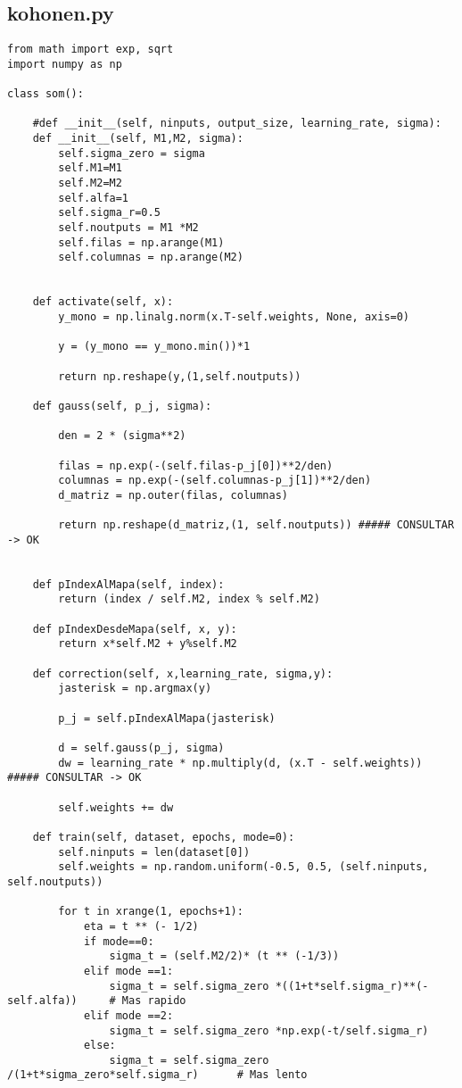\subsection{kohonen.py}
\begin{lstlisting}[caption=main.py]
from math import exp, sqrt
import numpy as np

class som():

    #def __init__(self, ninputs, output_size, learning_rate, sigma):
    def __init__(self, M1,M2, sigma):
        self.sigma_zero = sigma
        self.M1=M1
        self.M2=M2
        self.alfa=1
        self.sigma_r=0.5
        self.noutputs = M1 *M2
        self.filas = np.arange(M1)
        self.columnas = np.arange(M2)  
        

    def activate(self, x):
        y_mono = np.linalg.norm(x.T-self.weights, None, axis=0)

        y = (y_mono == y_mono.min())*1

        return np.reshape(y,(1,self.noutputs))

    def gauss(self, p_j, sigma):

        den = 2 * (sigma**2)

        filas = np.exp(-(self.filas-p_j[0])**2/den)
        columnas = np.exp(-(self.columnas-p_j[1])**2/den)        
        d_matriz = np.outer(filas, columnas)

        return np.reshape(d_matriz,(1, self.noutputs)) ##### CONSULTAR -> OK
        

    def pIndexAlMapa(self, index):
        return (index / self.M2, index % self.M2)
        
    def pIndexDesdeMapa(self, x, y):
        return x*self.M2 + y%self.M2
    
    def correction(self, x,learning_rate, sigma,y):
        jasterisk = np.argmax(y)

        p_j = self.pIndexAlMapa(jasterisk)
        
        d = self.gauss(p_j, sigma)
        dw = learning_rate * np.multiply(d, (x.T - self.weights)) ##### CONSULTAR -> OK
        
        self.weights += dw

    def train(self, dataset, epochs, mode=0):
        self.ninputs = len(dataset[0])
        self.weights = np.random.uniform(-0.5, 0.5, (self.ninputs, self.noutputs))

        for t in xrange(1, epochs+1):
            eta = t ** (- 1/2)
            if mode==0:
                sigma_t = (self.M2/2)* (t ** (-1/3))
            elif mode ==1:
                sigma_t = self.sigma_zero *((1+t*self.sigma_r)**(-self.alfa))     # Mas rapido
            elif mode ==2:
                sigma_t = self.sigma_zero *np.exp(-t/self.sigma_r)
            else:
                sigma_t = self.sigma_zero /(1+t*sigma_zero*self.sigma_r)      # Mas lento


\end{lstlisting}
